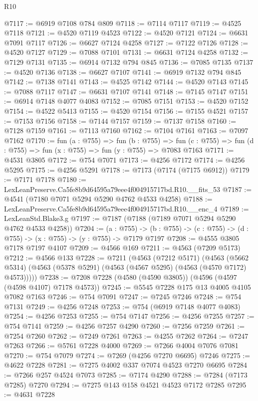 \begin{lexlean}{R10}
\begin{coremodule}
@7117 := @6919 @7108 @784 @809
@7118 := @7114 @7117
@7119 := @4525 @7118
@7121 := @4520 @7119 @4523
@7122 := @4520 @7121
@7124 := @6631 @7091 @7117
@7126 := @6627 @7124 @4258
@7127 := @7122 @7126
@7128 := @4520 @7127
@7129 := @7088 @7101
@7131 := @6631 @7124 @4258
@7132 := @7129 @7131
@7135 := @6914 @7132 @794 @845
@7136 := @7085 @7135
@7137 := @4520 @7136
@7138 := @6627 @7107
@7141 := @6919 @7132 @794 @845
@7142 := @7138 @7141
@7143 := @4525 @7142
@7144 := @4520 @7143
@7145 := @7088 @7117
@7147 := @6631 @7107 @7141
@7148 := @7145 @7147
@7151 := @6914 @7148 @4077 @4083
@7152 := @7085 @7151
@7153 := @4520 @7152
@7154 := @4522 @5413
@7155 := @4520 @7154
@7156 := @7155 @4521
@7157 := @7153 @7156
@7158 := @7144 @7157
@7159 := @7137 @7158
@7160 := @7128 @7159
@7161 := @7113 @7160
@7162 := @7104 @7161
@7163 := @7097 @7162
@7170 := fun (a : @755) =>
  fun (b : @755) =>
  fun (c : @755) => fun (d : @755) => fun (x : @755) => fun (y : @755) => @7083 @7163
@7171 := @4531 @3805
@7172 := @754 @7071
@7173 := @4256 @7172
@7174 := @4256 @5295
@7175 := @4256 @5291
@7178 := @7173 (@7174 (@7175 @6912))
@7179 := @7171 @7178
@7180 := LexLeanPreserve.Ca5fe8b9d64595a79eee4f004915717bd.R10.__fits_53
@7187 := @4541 (@7180 @7071 @5294 @5290 @4762 @4533 @4258)
@7188 := LexLeanPreserve.Ca5fe8b9d64595a79eee4f004915717bd.R10.__enc_4
@7189 := LexLeanStd.Blake3.g
@7197 := @7187 (@7188 (@7189 @7071 @5294 @5290 @4762 @4533 @4258))
@7204 := (a : @755) ->
  (b : @755) -> (c : @755) -> (d : @755) -> (x : @755) -> (y : @755) -> @7179 @7197
@7208 := @4555 @3805 @7178 @7197 @4107
@7209 := @4566 @169
@7211 := @4563 (@7209 @5173)
@7212 := @4566 @133
@7228 := @7211
    (@4563
      (@7212 @5171)
      (@4563 (@5662 @5314) (@4563 (@5378 @5291) (@4563 (@4567 @5295) (@4563 (@4570 @7172) @4573)))))
@7238 := @7208 @7228 (@4580 (@4590 @3805)) (@4596 (@4597 (@4598 @4107) @7178 @4573))
@7245 := @5545 @7228 @175 @13 @4005 @4105 @7082 @7163
@7246 := @754 @7091
@7247 := @7245 @7246
@7248 := @754 @7131
@7249 := @4256 @7248
@7253 := @754 (@6919 @7148 @4077 @4083)
@7254 := @4256 @7253
@7255 := @754 @7147
@7256 := @4256 @7255
@7257 := @754 @7141
@7259 := @4256 @7257 @4290
@7260 := @7256 @7259
@7261 := @7254 @7260
@7262 := @7249 @7261
@7263 := @4255 @7262
@7264 := @7247 @7263
@7266 := @5761 @7228 @4000
@7269 := @7266 @4004 @7076 @7081
@7270 := @754 @7079
@7274 := @7269 (@4256 @7270 @6695) @7246
@7275 := @4622 @7228
@7281 := @7275 @4002 @337 @7074 @4523 @7270 @6695
@7284 := @7266 @257 @4524 @7073
@7285 := @7174 @4290
@7288 := @7284 (@7173 @7285) @7270
@7294 := @7275 @143 @158 @4521 @4523 @7172 @7285
@7295 := @4631 @7228

\end{coremodule}
\end{lexlean}
